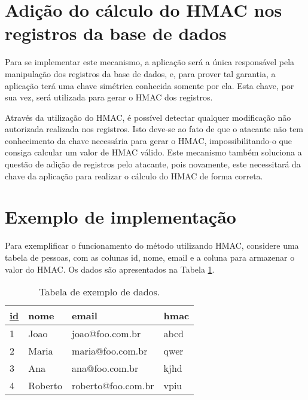 \section{Adi\c{c}\~{a}o do c\'{a}lculo do \ac{HMAC} nos registros da base de dados}

Para se implementar este mecanismo, a aplica\c{c}\~{a}o ser\'{a} a \'{u}nica respons\'{a}vel pela manipula\c{c}\~{a}o dos registros da base de dados, e, para prover tal garantia,
a aplica\c{c}\~{a}o ter\'{a} uma chave sim\'{e}trica conhecida somente por ela. Esta chave, por sua vez, ser\'{a} utilizada para gerar o \ac{HMAC} dos registros.

Atrav\'{e}s da utiliza\c{c}\~{a}o do \ac{HMAC}, \'{e} poss\'{i}vel detectar qualquer modifica\c{c}\~{a}o não autorizada realizada nos registros. Isto deve-se ao fato de que o atacante não tem conhecimento
da chave necessária para gerar o \ac{HMAC}, impossibilitando-o que consiga calcular um valor de \ac{HMAC} válido. Este mecanismo tamb\'{e}m soluciona a quest\~{a}o de adi\c{c}\~{a}o de registros pelo atacante,
pois novamente, este necessitar\'{a} da chave da aplica\c{c}\~{a}o para realizar o cálculo do \ac{HMAC} de forma correta.

\section{Exemplo de implementa\c{c}\~{a}o}

Para exemplificar o funcionamento do método utilizando \ac{HMAC}, considere uma tabela de pessoas, com as colunas id, nome, email e a coluna para armazenar o valor do \ac{HMAC}. Os dados s\~{a}o apresentados na Tabela \ref{tab:exemplo}.

\begin{table}[htb]\footnotesize
  \begin{center}
    \caption{Tabela de exemplo de dados.}\label{tab:exemplo}
    \begin{tabular}{|l|l|l|l|}\hline
      \textbf{\underline{id}} & \textbf{nome} & \textbf{email} & \textbf{hmac} \\ \hline
       1 & Joao & joao@foo.com.br & abcd \\ \hline
      2 & Maria & maria@foo.com.br & qwer \\ \hline
      3 & Ana & ana@foo.com.br & kjhd \\ \hline
      4 & Roberto & roberto@foo.com.br & vpiu \\ \hline
    \end{tabular}
  \end{center}
\end{table}

